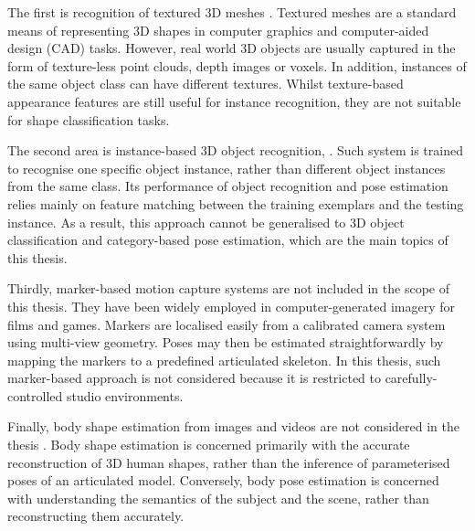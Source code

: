 The first is recognition of textured 3D meshes \cite{Zaharescu2009, Bronstein2011, Kokkinos2012}. Textured meshes are a standard means of representing 3D shapes in computer graphics and computer-aided design (CAD) tasks. 
However, real world 3D objects are usually captured in the form of texture-less point clouds, depth images or voxels. 
In addition, instances of the same object class can have different textures. Whilst texture-based appearance features are still useful for instance recognition, they are not suitable for shape classification tasks.  

The second area is instance-based 3D object recognition, \eg \cite{Mian2006, Rothganger2006, Shang2010}. Such system is trained to recognise one specific object instance, rather than different object instances from the same class. Its performance of object recognition and pose estimation relies mainly on feature matching between the training exemplars and the testing instance. As a result, this approach cannot be generalised to 3D object classification and category-based pose estimation, which are the main topics of this thesis.    
   

Thirdly, marker-based motion capture systems are not included in the scope of this thesis. They have been widely employed in computer-generated imagery for films and games. Markers are localised easily from a calibrated camera system using multi-view geometry. Poses may then be estimated straightforwardly by mapping the markers to a predefined articulated skeleton. In this thesis, such marker-based approach is not considered because it is restricted to carefully-controlled studio environments.  
 
Finally, body shape estimation from images and videos are not considered in the thesis \cite{Guan2009, Rother2009, Chen2011}. 
Body shape estimation is concerned primarily with the accurate reconstruction of 3D human shapes, rather than the inference of parameterised poses of an articulated model. Conversely, body pose estimation is concerned with understanding the semantics of the subject and the scene, rather than reconstructing them accurately. 

